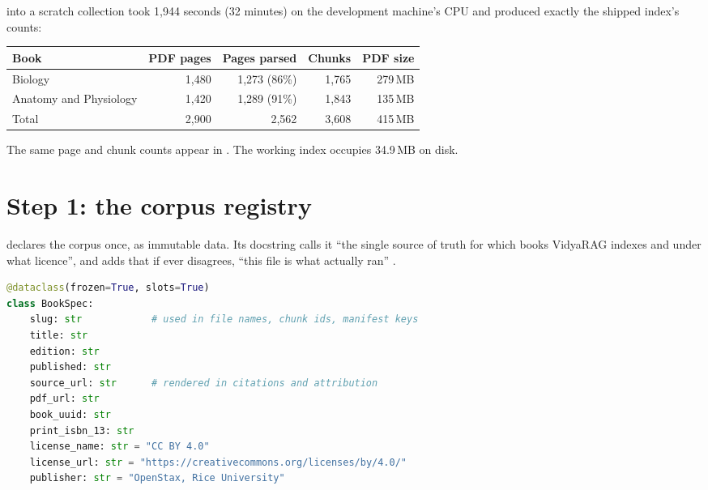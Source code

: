 \begin{measured}
 into a scratch collection took 1,944 seconds (32 minutes) on the development machine's CPU and produced exactly the shipped index's counts:

\begin{center}
\begin{tabular}{@{}lrrrr@{}}
\toprule
\textbf{Book} & \textbf{PDF pages} & \textbf{Pages parsed} & \textbf{Chunks} & \textbf{PDF size}\\
\midrule
Biology & 1,480 & 1,273 (86\%) & 1,765 & 279\,MB\\
Anatomy and Physiology & 1,420 & 1,289 (91\%) & 1,843 & 135\,MB\\
\midrule
Total & 2,900 & 2,562 & 3,608 & 415\,MB\\
\bottomrule
\end{tabular}
\end{center}

The same page and chunk counts appear in . The working index occupies 34.9\,MB on disk.
\end{measured}

\section{Step 1: the corpus registry}
\label{sec:corpus}

 declares the corpus once, as immutable data. Its docstring calls it \enquote{the single source of truth for which books VidyaRAG indexes and under what licence}, and adds that if  ever disagrees, \enquote{this file is what actually ran} .

\begin{lstlisting}[language=Python]
@dataclass(frozen=True, slots=True)
class BookSpec:
    slug: str            # used in file names, chunk ids, manifest keys
    title: str
    edition: str
    published: str
    source_url: str      # rendered in citations and attribution
    pdf_url: str
    book_uuid: str
    print_isbn_13: str
    license_name: str = "CC BY 4.0"
    license_url: str = "https://creativecommons.org/licenses/by/4.0/"
    publisher: str = "OpenStax, Rice University"
\end{lstlisting}

